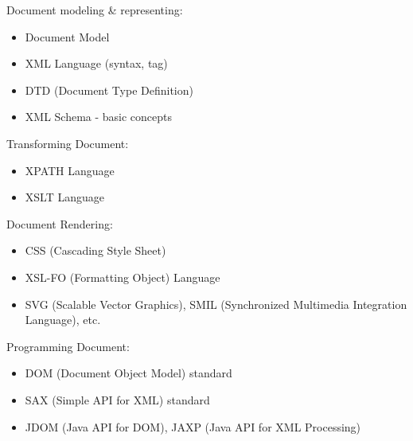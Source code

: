 Document modeling \& representing:
\begin{itemize}
    \item Document Model
    \item XML Language (syntax, tag)
    \item DTD (Document Type Definition)
    \item XML Schema - basic concepts
\end{itemize}
Transforming Document:
\begin{itemize}
    \item XPATH Language
    \item XSLT Language
\end{itemize}
Document Rendering:
\begin{itemize}
    \item CSS (Cascading Style Sheet)
    \item XSL-FO (Formatting Object) Language
    \item SVG (Scalable Vector Graphics), SMIL (Synchronized Multimedia Integration Language), etc.
\end{itemize}
Programming Document:
\begin{itemize}
    \item DOM (Document Object Model) standard
    \item SAX (Simple API for XML) standard
    \item JDOM (Java API for DOM), JAXP (Java API for XML Processing)
\end{itemize}